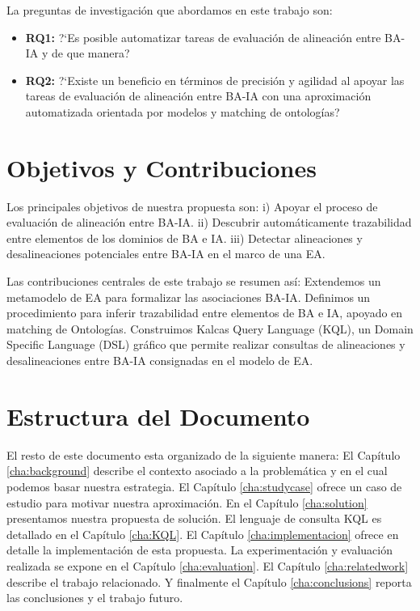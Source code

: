 La preguntas de investigaci\'on que abordamos en este trabajo son: 
\begin{itemize}
\item \textbf{RQ1:} ?`Es posible automatizar tareas de evaluaci\'on de alineaci\'on entre BA-IA y de que manera?
\item \textbf{RQ2:} ?`Existe un beneficio en t\'erminos de precisi\'on y agilidad al apoyar las tareas de evaluaci\'on de alineaci\'on entre BA-IA con una aproximaci\'on automatizada orientada por modelos y matching de ontolog\'ias?
\end{itemize}

\section{Objetivos y Contribuciones} \label{subsec:objective}

Los principales objetivos de nuestra propuesta son: i) Apoyar el proceso de evaluaci\'on de alineaci\'on entre BA-IA. ii) Descubrir autom\'aticamente trazabilidad entre elementos de los dominios de BA e IA. iii) Detectar alineaciones y desalineaciones potenciales entre BA-IA en el marco de una EA.

Las contribuciones centrales de este trabajo se resumen as\'i: Extendemos un metamodelo de EA para formalizar las asociaciones BA-IA. Definimos un procedimiento para inferir trazabilidad entre elementos de BA e IA, apoyado en matching de Ontolog\'ias. Construimos Kalcas Query Language (KQL), un Domain Specific Language (DSL) gr\'afico que permite realizar consultas de alineaciones y desalineaciones entre BA-IA consignadas en el modelo de EA.

\section{Estructura del Documento} \label{subsec:structure}
El resto de este documento esta organizado de la siguiente manera: El Cap\'itulo \ref{cha:background} describe el contexto asociado a la problem\'atica y en el cual podemos basar nuestra estrategia. El Cap\'itulo \ref{cha:studycase} ofrece un caso de estudio para motivar nuestra aproximaci\'on. En el Cap\'itulo \ref{cha:solution} presentamos nuestra propuesta de soluci\'on. El lenguaje de consulta KQL es detallado en el Cap\'itulo \ref{cha:KQL}. El Cap\'itulo \ref{cha:implementacion} ofrece en detalle la implementaci\'on de esta propuesta. La experimentaci\'on y evaluaci\'on realizada se expone en el Cap\'itulo \ref{cha:evaluation}. El  Cap\'itulo \ref{cha:relatedwork} describe el trabajo relacionado. Y finalmente el Cap\'itulo \ref{cha:conclusions} reporta las conclusiones y el trabajo futuro.